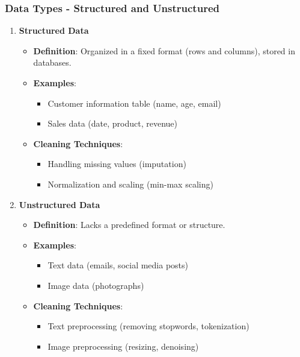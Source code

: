 \documentclass[aspectratio=169]{beamer}
\begin{document}
\begin{frame}[fragile]
    \frametitle{Data Types - Structured and Unstructured}
    \begin{enumerate}
        \item \textbf{Structured Data}
            \begin{itemize}
                \item \textbf{Definition}: Organized in a fixed format (rows and columns), stored in databases.
                \item \textbf{Examples}:
                    \begin{itemize}
                        \item Customer information table (name, age, email)
                        \item Sales data (date, product, revenue)
                    \end{itemize}
                \item \textbf{Cleaning Techniques}:
                    \begin{itemize}
                        \item Handling missing values (imputation)
                        \item Normalization and scaling (min-max scaling)
                    \end{itemize}
            \end{itemize}
        
        \item \textbf{Unstructured Data}
            \begin{itemize}
                \item \textbf{Definition}: Lacks a predefined format or structure.
                \item \textbf{Examples}:
                    \begin{itemize}
                        \item Text data (emails, social media posts)
                        \item Image data (photographs)
                    \end{itemize}
                \item \textbf{Cleaning Techniques}:
                    \begin{itemize}
                        \item Text preprocessing (removing stopwords, tokenization)
                        \item Image preprocessing (resizing, denoising)
                    \end{itemize}
            \end{itemize}
    \end{enumerate}
\end{frame}
\end{document}

